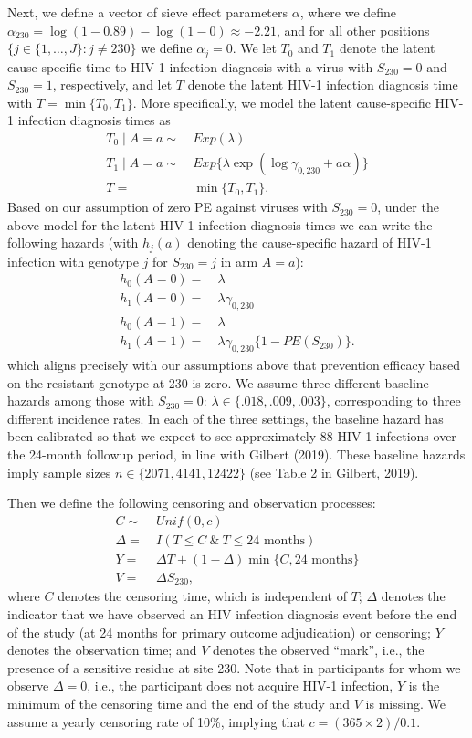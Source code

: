 \documentclass[10pt]{article}
\begin{document}
Next, we define a vector of sieve effect parameters $\alpha$, where we define $\alpha_{230} = \log(1 - 0.89) - \log(1 - 0) \approx -2.21$, and for all other positions $\{j \in \{1, \ldots, J\}: j \neq 230\}$ we define $\alpha_j = 0$. We let $T_0$ and $T_1$ denote the latent cause-specific time to HIV-1 infection diagnosis with a virus with $S_{230} = 0$ and $S_{230} = 1$, respectively, and let $T$ denote the latent HIV-1 infection diagnosis time with $T = \min \{T_0, T_1\}$. More specifically, we model the latent cause-specific HIV-1 infection diagnosis times as
\begin{align*}
  T_0 \mid A = a \sim & \ Exp(\lambda) \\
  T_1 \mid A = a \sim & \ Exp\{\lambda\exp(\log \gamma_{0,230} + a \alpha)\} \\
  T =& \ \min\{T_0, T_1\}.
\end{align*}
Based on our assumption of zero PE against viruses with $S_{230} = 0$, under the above model for the latent HIV-1 infection diagnosis times we can write the following hazards (with $h_j(a)$ denoting the cause-specific hazard of HIV-1 infection with genotype $j$ for $S_{230} = j$ in arm $A = a$):
\begin{align*}
  h_0(A = 0) =& \ \lambda \\
  h_1(A = 0) =& \ \lambda \gamma_{0,230} \\
  h_0(A = 1) =& \ \lambda \\
  h_1(A = 1) =& \ \lambda \gamma_{0,230} \{1 - PE(S_{230})\}.
\end{align*}
which aligns precisely with our assumptions above that prevention efficacy based on the resistant genotype at 230 is zero. We assume three different baseline hazards among those with $S_{230} = 0$: $\lambda \in \{.018, .009, .003\}$, corresponding to three different incidence rates. In each of the three settings, the baseline hazard has been calibrated so that we expect to see approximately 88 HIV-1 infections over the 24-month followup period, in line with Gilbert (2019). These baseline hazards imply sample sizes $n \in \{2071, 4141, 12422\}$ (see Table 2 in Gilbert, 2019).

Then we define the following censoring and observation processes:
\begin{align*}
  C \sim & \ Unif(0, c) \\
  \Delta =& \ I(T \leq C \ \& \ T \leq \text{24 months}) \\
  Y =& \ \Delta T + (1 - \Delta) \min\{C, \text{24 months}\} \\
  V =& \ \Delta S_{230},
\end{align*}
where $C$ denotes the censoring time, which is independent of $T$; $\Delta$ denotes the indicator that we have observed an HIV infection diagnosis event before the end of the study (at 24 months for primary outcome adjudication) or censoring; $Y$ denotes the observation time; and $V$ denotes the observed ``mark'', i.e., the presence of a sensitive residue at site 230. Note that in participants for whom we observe $\Delta = 0$, i.e., the participant does not acquire HIV-1 infection, $Y$ is the minimum of the censoring time and the end of the study and $V$ is missing. We assume a yearly censoring rate of 10\%, implying that $c = (365 \times 2) / 0.1$.
\end{document}
